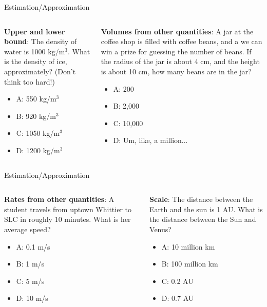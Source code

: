 \documentclass{beamer}
\begin{document}
\begin{frame}{Estimation/Approximation}
\small
\begin{columns}[T]
\begin{column}{0.5\textwidth}
\textbf{Upper and lower bound}: The density of water is 1000 kg/m$^3$.  What is the density of ice, approximately?  (Don't think too hard!)
\begin{itemize}
\item A: 550 kg/m$^3$
\item B: 920 kg/m$^3$
\item C: 1050 kg/m$^3$
\item D: 1200 kg/m$^3$
\end{itemize}
\end{column}
\begin{column}{0.5\textwidth}
\textbf{Volumes from other quantities}: A jar at the coffee shop is filled with coffee beans, and a we can win a prize for guessing the number of beans.  If the radius of the jar is about 4 cm, and the height is about 10 cm, how many beans are in the jar?
\vspace{0.55cm}
\begin{itemize}
\item A: 200
\item B: 2,000
\item C: 10,000
\item D: Um, like, a million...
\end{itemize}
\end{column}
\end{columns}
\end{frame}

\begin{frame}{Estimation/Approximation}
\small
\begin{columns}[T]
\begin{column}{0.5\textwidth}
\textbf{Rates from other quantities}: A student travels from uptown Whittier to SLC in roughly 10 minutes.  What is her average speed?
\begin{itemize}
\item A: 0.1 m/s
\item B: 1 m/s
\item C: 5 m/s
\item D: 10 m/s
\end{itemize}
\end{column}
\begin{column}{0.5\textwidth}
\textbf{Scale}: The distance between the Earth and the sun is 1 AU.  What is the distance between the Sun and Venus?
\vspace{0.55cm}
\begin{itemize}
\item A: 10 million km
\item B: 100 million km
\item C: 0.2 AU
\item D: 0.7 AU
\end{itemize}
\end{column}
\end{columns}
\end{frame}
\end{document}
